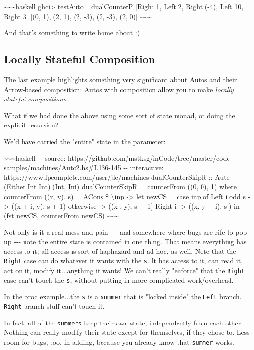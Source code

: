\documentclass[]{article}
\begin{document}
\textasciitilde{}\textasciitilde{}\textasciitilde{}haskell ghci\textgreater{}
testAuto\_ dualCounterP {[}Right 1, Left 2, Right (-4), Left 10, Right 3{]}
{[}(0, 1), (2, 1), (2, -3), (2, -3), (2, 0){]}
\textasciitilde{}\textasciitilde{}\textasciitilde{}

And that's something to write home about :)

\subsection{Locally Stateful Composition}

The last example highlights something very significant about Autos and their
Arrow-based composition: Autos with composition allow you to make \emph{locally
stateful compositions}.

What if we had done the above using some sort of state monad, or doing the
explicit recursion?

We'd have carried the "entire" state in the parameter:

\textasciitilde{}\textasciitilde{}\textasciitilde{}haskell -\/- source:
https://github.com/mstksg/inCode/tree/master/code-samples/machines/Auto2.hs\#L136-145
-\/- interactive: https://www.fpcomplete.com/user/jle/machines dualCounterSkipR
:: Auto (Either Int Int) (Int, Int) dualCounterSkipR = counterFrom ((0, 0), 1)
where counterFrom ((x, y), s) = ACons \$ \textbackslash{}inp -\textgreater{} let
newCS = case inp of Left i \textbar{} odd s -\textgreater{} ((x + i, y), s + 1)
\textbar{} otherwise -\textgreater{} ((x , y), s + 1) Right i -\textgreater{}
((x, y + i), s ) in (fst newCS, counterFrom newCS)
\textasciitilde{}\textasciitilde{}\textasciitilde{}

Not only is it a real mess and pain -\/-\/- and somewhere where bugs are rife to
pop up -\/-\/- note the entire state is contained in one thing. That means
everything has access to it; all access is sort of haphazard and ad-hoc, as
well. Note that the \texttt{Right} case can do whatever it wants with the
\texttt{s}. It has access to it, can read it, act on it, modify it...anything it
wants! We can't really "enforce" that the \texttt{Right} case can't touch the
\texttt{s}, without putting in more complicated work/overhead.

In the proc example...the \texttt{s} is a \texttt{summer} that is "locked
inside" the \texttt{Left} branch. \texttt{Right} branch stuff can't touch it.

In fact, all of the \texttt{summers} keep their own state, independently from
each other. Nothing can really modify their state except for themselves, if they
chose to. Less room for bugs, too, in adding, because you already know that
\texttt{summer} works.
\end{document}
